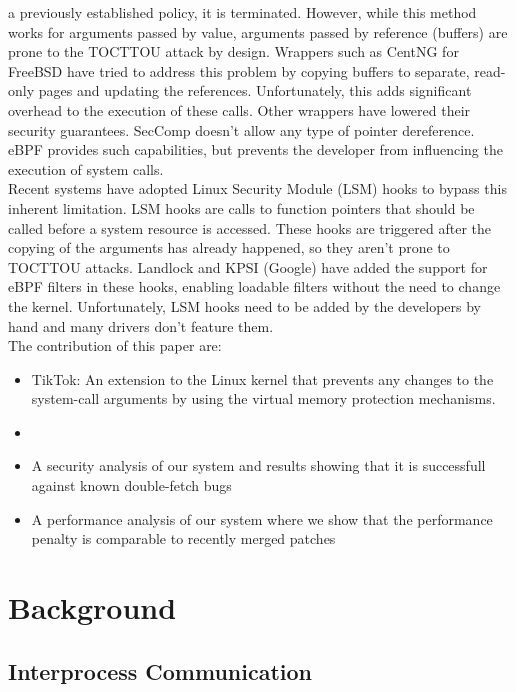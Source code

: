 \documentclass[conference]{IEEEtran}
\begin{document}
a previously established policy, it is terminated. However, while this method works for arguments passed by value, arguments passed by reference (buffers) are prone to the TOCTTOU attack by design. Wrappers such as CentNG for FreeBSD have
tried to address this problem by copying buffers to separate, read-only pages and updating the references. Unfortunately, this adds significant overhead to the execution of these calls. Other wrappers have lowered their security guarantees.
SecComp doesn't allow any type of pointer dereference. eBPF provides such capabilities, but prevents the developer from influencing the execution of system calls.
\\
Recent systems have adopted Linux Security Module (LSM) hooks to bypass this inherent limitation. LSM hooks are calls to function pointers that should be called before a system resource is accessed. These hooks are triggered after the
copying of the arguments has already happened, so they aren't prone to TOCTTOU attacks. Landlock and KPSI (Google) have added the support for eBPF filters in these hooks, enabling loadable filters without the need to change the kernel.
Unfortunately, LSM hooks need to be added by the developers by hand and many drivers don't feature them.
\\
The contribution of this paper are:
\begin{itemize}
\item TikTok: An extension to the Linux kernel that prevents any changes to the system-call arguments by using the virtual memory protection mechanisms.
\item 
\item A security analysis of our system and results showing that it is successfull against known double-fetch bugs
\item A performance analysis of our system where we show that the performance penalty is comparable to recently merged patches
\end{itemize}

\section{Background}


\subsection{Interprocess Communication}
\end{document}

